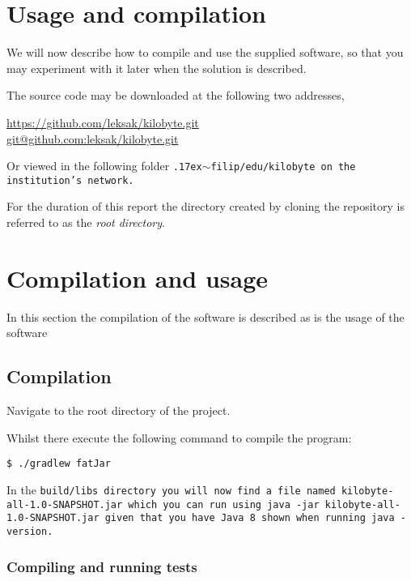 \section{Usage and compilation}

We will now describe how to compile and use the supplied software, so
that you may experiment with it later when the solution is described.

The source code may be downloaded at the following two addresses,

\begin{center}
\url{https://github.com/leksak/kilobyte.git} \\
\url{git@github.com:leksak/kilobyte.git}
\end{center}

Or viewed in the following folder
\tt{\raise.17ex\hbox{$\scriptstyle\mathtt{\sim}$}filip/edu/kilobyte}
on the institution's network.

For the duration of this report the directory created by cloning
the repository is referred to as the \emph{root directory}.

\section{Compilation and usage}

In this section the compilation of the software is described as
is the usage of the software

\subsection{Compilation}

Navigate to the root directory of the project.

Whilst there execute the following command to compile the program:

\begin{lstlisting}[style=plain]
$ ./gradlew fatJar
\end{lstlisting}

In the \tt{build/libs} directory you will now find a file named
\tt{kilobyte-all-1.0-SNAPSHOT.jar} which you can run using \tt{java -jar
  kilobyte-all-1.0-SNAPSHOT.jar} given that you have Java 8 shown when running
\tt{java -version}.

\subsubsection{Compiling and running tests}

